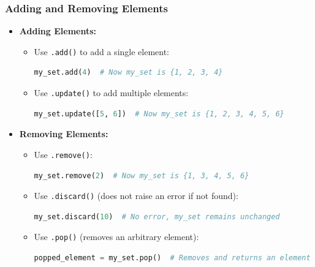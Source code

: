 \documentclass{beamer}
\begin{document}
\begin{frame}[fragile]
    \frametitle{Adding and Removing Elements}
    \begin{itemize}
        \item \textbf{Adding Elements:}
        \begin{itemize}
            \item Use \texttt{.add()} to add a single element:
            \begin{lstlisting}[language=Python]
my_set.add(4)  # Now my_set is {1, 2, 3, 4}
            \end{lstlisting}
            \item Use \texttt{.update()} to add multiple elements:
            \begin{lstlisting}[language=Python]
my_set.update([5, 6])  # Now my_set is {1, 2, 3, 4, 5, 6}
            \end{lstlisting}
        \end{itemize}

        \item \textbf{Removing Elements:}
        \begin{itemize}
            \item Use \texttt{.remove()}:
            \begin{lstlisting}[language=Python]
my_set.remove(2)  # Now my_set is {1, 3, 4, 5, 6}
            \end{lstlisting}
            \item Use \texttt{.discard()} (does not raise an error if not found):
            \begin{lstlisting}[language=Python]
my_set.discard(10)  # No error, my_set remains unchanged
            \end{lstlisting}
            \item Use \texttt{.pop()} (removes an arbitrary element):
            \begin{lstlisting}[language=Python]
popped_element = my_set.pop()  # Removes and returns an element
            \end{lstlisting}
        \end{itemize}
    \end{itemize}
\end{frame}
\end{document}
